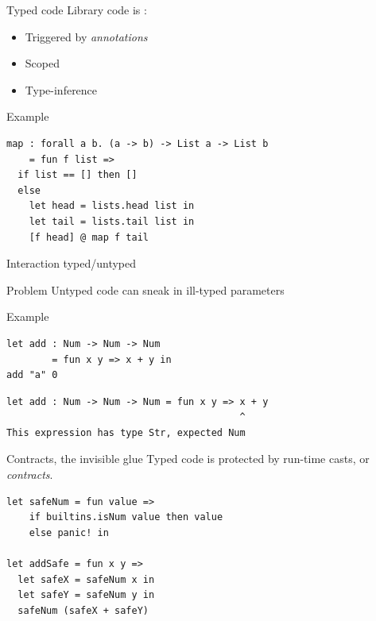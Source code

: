 \documentclass[aspectratio=169]{beamer}
\newcommand{\couleur}[2]{{\color{#1}{#2}}}
\begin{document}
\begin{frame}[fragile]{Typed code}
    Library code is \couleur{blue-portage}{statically typed}:
    \begin{itemize}
        \item Triggered by \emph{annotations}
        \item Scoped
        \item Type-inference
    \end{itemize}

\begin{exampleblock}{Example}
\begin{lstlisting}[language=Nickel,title={Statically typed map}]
map : forall a b. (a -> b) -> List a -> List b
    = fun f list =>
  if list == [] then []
  else
    let head = lists.head list in
    let tail = lists.tail list in
    [f head] @ map f tail
\end{lstlisting}
\end{exampleblock}
\end{frame}

\begin{frame}[fragile]{Interaction typed/untyped}

\begin{alertblock}{Problem}
Untyped code can sneak in ill-typed parameters
\end{alertblock}

\vspace{10pt}

\begin{exampleblock}{Example}
\begin{lstlisting}[language=Nickel]
let add : Num -> Num -> Num
        = fun x y => x + y in
add "a" 0
\end{lstlisting}

\begin{lstlisting}[language=Terminal,style=Terminal]
let add : Num -> Num -> Num = fun x y => x + y
                                         ^
This expression has type Str, expected Num
\end{lstlisting}
\end{exampleblock}
\end{frame}

\begin{frame}[fragile]{Contracts, the invisible glue}
Typed code is protected by run-time casts, or \emph{contracts}.

\vspace{10pt}

\begin{lstlisting}[language=Nickel,title={Generated code for \lstinline+add+
(simplified)}]
let safeNum = fun value =>
    if builtins.isNum value then value
    else panic! in

let addSafe = fun x y =>
  let safeX = safeNum x in
  let safeY = safeNum y in
  safeNum (safeX + safeY)
\end{lstlisting}
\end{frame}
\end{document}
